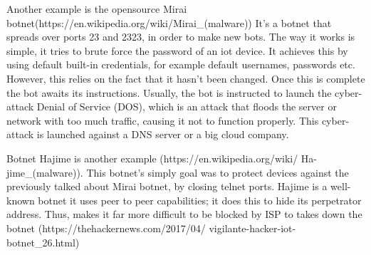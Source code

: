 \documentclass[../main.tex]{subfiles}
\begin{document}
Another example is the opensource Mirai botnet(https://en.wikipedia.org/wiki/Mirai\_(malware)) 
It's a botnet that spreads over ports 23 and 2323, in order to make new bots. 
The way it works is simple, it tries to brute force the password of an iot device. 
It achieves this by using default built-in credentials, for example default usernames, passwords etc. However, this relies on the fact that it hasn't been changed. 
Once this is complete the bot awaits its instructions. 
Usually, the bot is instructed to launch the cyber-attack Denial of Service (DOS), which is an attack that floods the server or network with too much traffic, causing it not to function properly. 
This cyber-attack is launched against a DNS server or a big cloud company. 

Botnet Hajime is another example (https://en.wikipedia.org/wiki/ Ha-jime\_(malware)). 
This botnet's simply goal was to protect devices against the previously talked about Mirai botnet, by closing telnet ports. 
Hajime is a well-known botnet it uses peer to peer capabilities; it does this to hide its perpetrator address. 
Thus, makes it far more difficult to be blocked by ISP to takes down the botnet (https://thehackernews.com/2017/04/ vigilante-hacker-iot-botnet\_26.html) 
\end{document}
